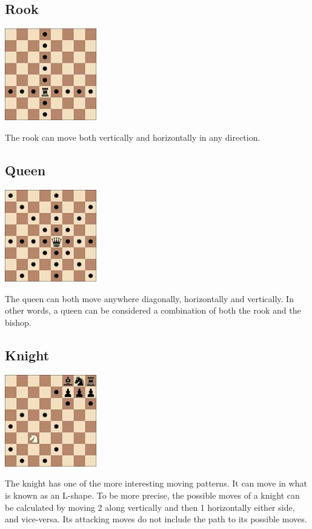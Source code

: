 \documentclass[]{report}
\begin{document}
\subsection{Rook}
\begin{center}
	\includegraphics[width=0.3\textwidth]{images/boards/rook_movement}
\end{center}
The rook can move both vertically and horizontally in any direction.
\subsection{Queen}
\begin{center}
	\includegraphics[width=0.3\textwidth]{images/boards/queen_movement}
\end{center}
The queen can both move anywhere diagonally, horizontally and vertically. In other words, a queen can be considered a combination of both the rook and the bishop.
\subsection{Knight}
\begin{center}
	\includegraphics[width=0.3\textwidth]{images/boards/knight_movement}
\end{center}
The knight has one of the more interesting moving patterns. It can move in what is known as an L-shape. To be more precise, the possible moves of a knight can be calculated by moving 2 along vertically and then 1 horizontally either side, and vice-versa. Its attacking moves do not include the path to its possible moves.
\end{document}
